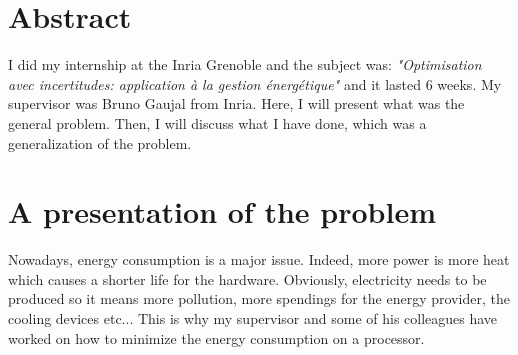 \documentclass[
10pt, %
a4paper, %
oneside, %
headinclude,footinclude, %
BCOR5mm, %
]{scrartcl}
\title{\normalfont\spacedallcaps{Internship report}} %
\author{\spacedlowsmallcaps{Vincent RÉBISCOUL}} %
\date{} %
\begin{document}

\renewcommand{\sectionmark}[1]{\markright{\spacedlowsmallcaps{#1}}} %
\lehead{\mbox{\llap{\small\thepage\kern1em\color{halfgray} \vline}\color{halfgray}\hspace{0.5em}\rightmark\hfil}} %

\pagestyle{scrheadings} %


\maketitle %

\setcounter{tocdepth}{2} %

\tableofcontents %
\section*{Abstract}
I did my internship at the Inria Grenoble and the subject was:
\textit{"Optimisation avec incertitudes: application à la gestion
  énergétique"} and it lasted 6 weeks. My supervisor was Bruno Gaujal
from  Inria. Here, I will present what was the general problem. Then,
I will discuss what I have done, which was a generalization of the
problem.


\newpage %

\section{A presentation of the problem}
Nowadays, energy consumption is a major issue. Indeed, more power is
more heat which causes a shorter life for the hardware. Obviously,
electricity needs to be produced so it means more pollution, more
spendings for the energy provider, the cooling devices etc... This is
why my supervisor and some of his colleagues have worked on how to minimize the
energy consumption on a processor.
\end{document}
